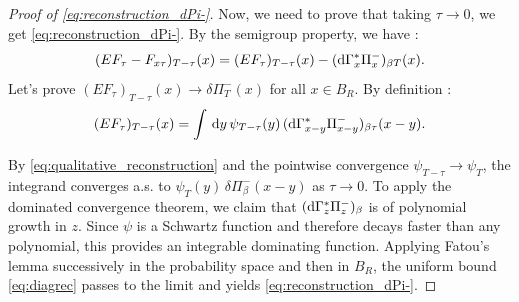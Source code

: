 \begin{proof}[Proof of \eqref{eq:reconstruction_dPi-}]
Now, we need to prove that taking $\tau \rightarrow 0$, we get \eqref{eq:reconstruction_dPi-}.
By the semigroup property, we have : 
$$(EF_\tau - F_{x\tau})_{T-\tau}(x) = (EF_\tau)_{T-\tau}(x) - (\mathrm{d}\Gamma^*_x \Pi^-_x)_{\beta T}(x).$$
Let's prove $(EF_\tau)_{T-\tau}(x)\longrightarrow \delta \Pi^-_T(x)$ for all $x\in B_R.$
By definition :
\begin{equation}
    (EF_\tau)_{T-\tau}(x) =  \int  \,\mathrm{d} y \, \psi_{T-\tau}(y)\, (\mathrm{d}\Gamma^*_{x-y} \Pi^-_{x-y})_{\beta\tau}(x-y). 
\end{equation}

By \eqref{eq:qualitative_reconstruction} and the pointwise convergence $\psi_{T-\tau} \to \psi_T$, the integrand converges a.s. to $\psi_T(y)\, \delta\Pi^-_\beta(x-y)$ as $\tau \to 0$. 
To apply the dominated convergence theorem, we claim that $(\mathrm{d}\Gamma^*_z \Pi^-_z)_\beta$ is of polynomial growth in $z$.
Since $\psi$ is a Schwartz function and therefore decays faster than any polynomial, this provides an integrable dominating function.
Applying Fatou's lemma successively in the probability space and then in $B_R$, the uniform bound \eqref{eq:diagrec} passes to the limit and yields \eqref{eq:reconstruction_dPi-}.
\end{proof}

